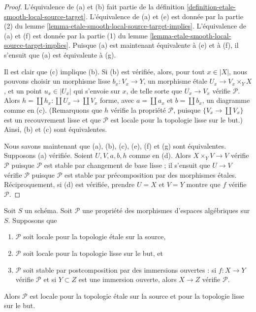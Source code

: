 \begin{proof}
L'équivalence de (a) et (b) fait partie de la
définition \ref{definition-etale-smooth-local-source-target}.
L'équivalence de (a) et (e) est donnée par la
partie (2) du lemme \ref{lemma-etale-smooth-local-source-target-implies}.
L'équivalence de (a) et (f) est donnée par la
partie (1) du lemme \ref{lemma-etale-smooth-local-source-target-implies}.
Puisque (a) est maintenant équivalente à (e) et à (f), il s'ensuit que
(a) est équivalente à (g).

\medskip\noindent
Il est clair que (c) implique (b). Si (b) est vérifiée, alors, pour tout
$x \in |X|$, nous pouvons choisir un morphisme lisse
$b_x : V_x \to Y$, un morphisme \'etale $U_x \to V_x \times_Y X$,
et un point $u_x \in |U_x|$ qui s'envoie sur $x$,
de telle sorte que $U_x \to V_x$ vérifie $\mathcal{P}$.
Alors $h = \coprod h_x : \coprod U_x \to \coprod V_x$
forme, avec $a = \coprod a_x$ et $b = \coprod b_x$, un diagramme comme en (c).
(Remarquons que $h$ vérifie la propriété $\mathcal{P}$, puisque $\{V_x \to \coprod V_x\}$
est un recouvrement lisse et que $\mathcal{P}$ est locale pour la topologie lisse sur le but.)
Ainsi, (b) et (c) sont équivalentes.

\medskip\noindent
Nous savons maintenant que (a), (b), (c), (e), (f) et (g) sont équivalentes.
Supposons (a) vérifiée. Soient $U, V, a, b, h$ comme en (d). Alors
$X \times_Y V \to V$ vérifie $\mathcal{P}$ puisque $\mathcal{P}$ est stable par
changement de base lisse ; il s'ensuit que $U \to V$ vérifie $\mathcal{P}$ puisque $\mathcal{P}$
est stable par précomposition par des morphismes \'etales. Réciproquement, si (d)
est vérifiée, prendre $U = X$ et $V = Y$ montre que $f$ vérifie $\mathcal{P}$.
\end{proof}

\begin{lemma}
\label{lemma-etale-smooth-local-source-target}
Soit $S$ un schéma.
Soit $\mathcal{P}$ une propriété des morphismes d'espaces algébriques sur $S$.
Supposons que
\begin{enumerate}
\item $\mathcal{P}$ soit locale pour la topologie \'etale sur la source,
\item $\mathcal{P}$ soit locale pour la topologie lisse sur le but, et
\item $\mathcal{P}$ soit stable par postcomposition par des immersions ouvertes :
si $f : X \to Y$ vérifie $\mathcal{P}$ et si $Y \subset Z$ est une immersion ouverte,
alors $X \to Z$ vérifie $\mathcal{P}$.
\end{enumerate}
Alors $\mathcal{P}$ est locale pour la topologie \'etale sur la source et pour la topologie lisse sur le but.
\end{lemma}

